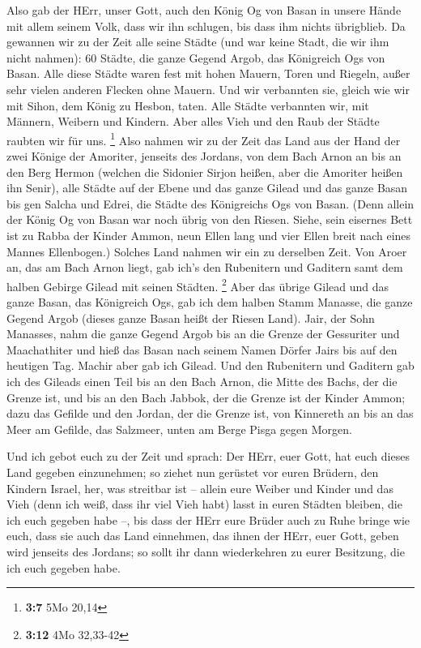  Also gab der HErr, unser Gott, auch den König Og von Basan
in unsere Hände mit allem seinem Volk, dass wir ihn schlugen, bis dass
ihm nichts übrigblieb.  Da gewannen wir zu der Zeit alle
seine Städte (und war keine Stadt, die wir ihm nicht nahmen): 60 Städte,
die ganze Gegend Argob, das Königreich Ogs von Basan.  Alle
diese Städte waren fest mit hohen Mauern, Toren und Riegeln, außer sehr
vielen anderen Flecken ohne Mauern.  Und wir verbannten sie,
gleich wie wir mit Sihon, dem König zu Hesbon, taten. Alle Städte
verbannten wir, mit Männern, Weibern und Kindern.  Aber
alles Vieh und den Raub der Städte raubten wir für uns. \footnote{\textbf{3:7}
  5Mo 20,14}  Also nahmen wir zu der Zeit das Land aus der
Hand der zwei Könige der Amoriter, jenseits des Jordans, von dem Bach
Arnon an bis an den Berg Hermon  (welchen die Sidonier
Sirjon heißen, aber die Amoriter heißen ihn Senir),  alle
Städte auf der Ebene und das ganze Gilead und das ganze Basan bis gen
Salcha und Edrei, die Städte des Königreichs Ogs von Basan.
 (Denn allein der König Og von Basan war noch übrig von den
Riesen. Siehe, sein eisernes Bett ist zu Rabba der Kinder Ammon, neun
Ellen lang und vier Ellen breit nach eines Mannes Ellenbogen.)
 Solches Land nahmen wir ein zu derselben Zeit. Von Aroer
an, das am Bach Arnon liegt, gab ich's den Rubenitern und Gaditern samt
dem halben Gebirge Gilead mit seinen Städten. \footnote{\textbf{3:12}
  4Mo 32,33-42}  Aber das übrige Gilead und das ganze
Basan, das Königreich Ogs, gab ich dem halben Stamm Manasse, die ganze
Gegend Argob (dieses ganze Basan heißt der Riesen Land). 
Jair, der Sohn Manasses, nahm die ganze Gegend Argob bis an die Grenze
der Gessuriter und Maachathiter und hieß das Basan nach seinem Namen
Dörfer Jairs bis auf den heutigen Tag.  Machir aber gab ich
Gilead.  Und den Rubenitern und Gaditern gab ich des
Gileads einen Teil bis an den Bach Arnon, die Mitte des Bachs, der die
Grenze ist, und bis an den Bach Jabbok, der die Grenze ist der Kinder
Ammon;  dazu das Gefilde und den Jordan, der die Grenze
ist, von Kinnereth an bis an das Meer am Gefilde, das Salzmeer, unten am
Berge Pisga gegen Morgen.

 Und ich gebot euch zu der Zeit und sprach: Der HErr, euer
Gott, hat euch dieses Land gegeben einzunehmen; so ziehet nun gerüstet
vor euren Brüdern, den Kindern Israel, her, was streitbar ist --
 allein eure Weiber und Kinder und das Vieh (denn ich weiß,
dass ihr viel Vieh habt) lasst in euren Städten bleiben, die ich euch
gegeben habe --,  bis dass der HErr eure Brüder auch zu
Ruhe bringe wie euch, dass sie auch das Land einnehmen, das ihnen der
HErr, euer Gott, geben wird jenseits des Jordans; so sollt ihr dann
wiederkehren zu eurer Besitzung, die ich euch gegeben habe.

